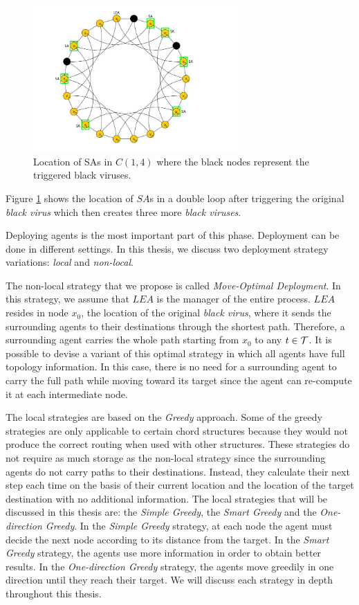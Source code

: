\begin{figure}[H]
  \centering  
  \includegraphics[width=0.7\textwidth]{figures/dloop_ph2.jpg}
  \caption{Location of SAs in  $C(1,4)$ where the black nodes represent the triggered black viruses.}\label{fig:second phase}
\end{figure}

Figure \ref{fig:second phase} shows the location of $SA$s  in a double loop after triggering the original {\it black virus} which then creates three more {\it black viruses}.


Deploying agents is the most important part of this phase. Deployment can be done in different settings. In this thesis, we discuss two deployment strategy variations: {\em local} and {\em non-local}.

The non-local strategy that we propose  is called {\em Move-Optimal Deployment}. In this strategy, we assume that $LEA$ is the manager of the entire process. $LEA$ resides in node $x_0$, the location of the original {\it black virus}, where it sends the surrounding agents to their destinations through the shortest path.
Therefore, a surrounding agent carries the whole path starting from $x_0$ to any $t \in \cal T$. It is possible to devise a variant of this optimal strategy in which all agents have full topology information. In this case, there is no need for a surrounding agent to carry the full path while moving toward its target since the agent can re-compute it at each intermediate node. 
 
The local strategies are based on the {\em Greedy} approach.  Some of the greedy strategies are only applicable to certain  chord structures  because  they would not produce the correct routing when used with other structures. These strategies do not require as much storage as the non-local strategy since the surrounding agents do not carry paths to their destinations. Instead, they calculate their next step each time on the basis of their current location and the location of the target destination with no additional information. The local strategies that will be discussed in this thesis are: the {\it Simple Greedy}, the {\em Smart Greedy} and the {\em One-direction Greedy}.
In the {\it Simple Greedy} strategy, at each node the agent must decide the next node according to its distance from the target. In the {\em Smart Greedy} strategy,  the agents use more information in order to obtain better results. In the {\em One-direction Greedy} strategy, the agents move greedily in one direction until they reach their target. We will discuss each strategy in depth throughout this thesis. 




